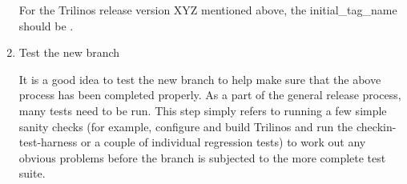 \documentclass[12pt,relax]{TrilinosDevGuide}
\begin{document}
\begin{enumerate}

For the Trilinos release version XYZ mentioned above, the initial\_tag\_name 
should be .

\item Test the new branch

It is a good idea to test the new branch to help make sure that the above 
process has been completed properly.  As a part of the general release process,
many tests need to be run.  This step simply refers to running a few 
simple sanity checks (for example, configure and build Trilinos and run the 
checkin-test-harness or a couple of individual regression tests) to work 
out any obvious problems before the branch is subjected to the more 
complete test suite.

\end{enumerate}

\end{document}
